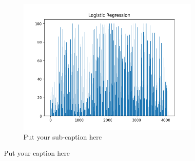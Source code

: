 \documentclass{article}
\begin{document}
\begin{figure}[H]
\begin{subfigure}{.33\textwidth}
  \centering
  \includegraphics[width=1\linewidth]{1e/Dogs 2 clusters/selection Logistic.png}  
  \caption{Put your sub-caption here}
  \label{fig:sub-second}
\end{subfigure}
\caption{Put your caption here}
\label{example dog}
\end{figure}
\end{document}
